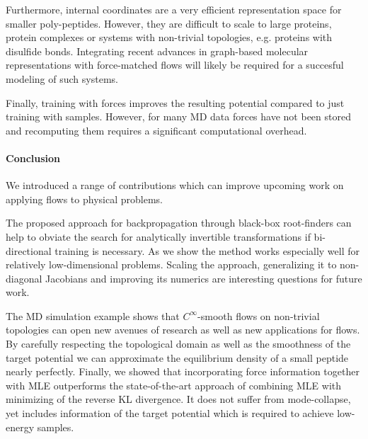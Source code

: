 \documentclass{article}
\begin{document}
    Furthermore, internal coordinates are a very efficient representation space for smaller poly-peptides. However, they are difficult to scale to large proteins, protein complexes or systems with non-trivial topologies, e.g. proteins with disulfide bonds. Integrating recent advances in graph-based molecular representations with force-matched flows will likely be required for a succesful modeling of such systems.
    
    Finally, training with forces improves the resulting potential compared to just training with samples. However, for many MD data forces have not been stored and recomputing them requires a significant computational overhead. 

\paragraph{Conclusion}
    
We introduced a range of contributions which can improve upcoming work on applying flows to physical problems.

The proposed approach for backpropagation through black-box root-finders can help to obviate the search for analytically invertible transformations if bi-directional training is necessary. As we show the method works especially well for relatively low-dimensional problems. Scaling the approach, generalizing it to non-diagonal Jacobians and improving its numerics are interesting questions for future work.

The MD simulation example shows that $C^{\infty}$-smooth flows on non-trivial topologies can open new avenues of research as well as new applications for flows. By carefully respecting the topological domain as well as the smoothness of the target potential we can approximate the equilibrium density of a small peptide nearly perfectly.
Finally, we showed that incorporating force information together with MLE outperforms the state-of-the-art approach of combining MLE with minimizing of the reverse KL divergence. It does not suffer from mode-collapse, yet includes information of the target potential which is required to achieve low-energy samples. 

\end{document}
